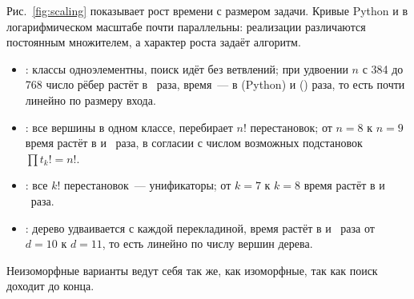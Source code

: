Рис.~\ref{fig:scaling} показывает рост времени с размером задачи.
Кривые Python и \Cpp{} в логарифмическом масштабе почти параллельны: реализации различаются постоянным множителем, а характер роста задаёт алгоритм.
\begin{itemize}
    \item {}: классы одноэлементны, поиск идёт без ветвлений; при удвоении $n$ с 384 до 768 число рёбер растёт в \RigidRatioEdges{}~раза, время~--- в \RigidRatioPy{} (Python) и \RigidRatioCpp{} (\Cpp{}) раза, то есть почти линейно по размеру входа.
    \item {}: все вершины в одном классе, \ISOMm{} перебирает $n!$ перестановок; от $n = 8$ к $n = 9$ время растёт в \CycleRatioPy{} и \CycleRatioCpp{}~раза, в согласии с числом возможных подстановок $\prod t_k! = n!$.
    \item {}: все $k!$ перестановок~--- унификаторы; от $k = 7$ к $k = 8$ время растёт в \BrothersRatioPy{} и \BrothersRatioCpp{}~раза.
    \item {}: дерево удваивается с каждой перекладиной, время растёт в \LadderRatioPy{} и \LadderRatioCpp{}~раза от $d = 10$ к $d = 11$, то есть линейно по числу вершин дерева.
\end{itemize}
Неизоморфные варианты ведут себя так же, как изоморфные, так как поиск доходит до конца.

